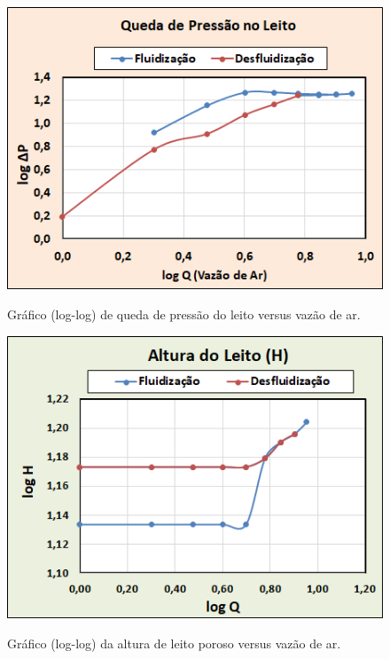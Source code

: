 \begin{figure}[H]
	\begin{center}
		\includegraphics[scale=1, trim={0 0 0 0}]{figuras/ladeq/fluid/graph1}
		\label{fig7}
		\caption{Gráfico (log-log) de queda de pressão do leito versus vazão de ar.}
	\end{center}
\end{figure}


\begin{figure}[H]
	\begin{center}
		\includegraphics[scale=1, trim={0 0 0 0}]{figuras/ladeq/fluid/graph2}
		\label{fig7}
		\caption{Gráfico (log-log) da altura de leito poroso versus vazão de ar.}
	\end{center}
\end{figure}


